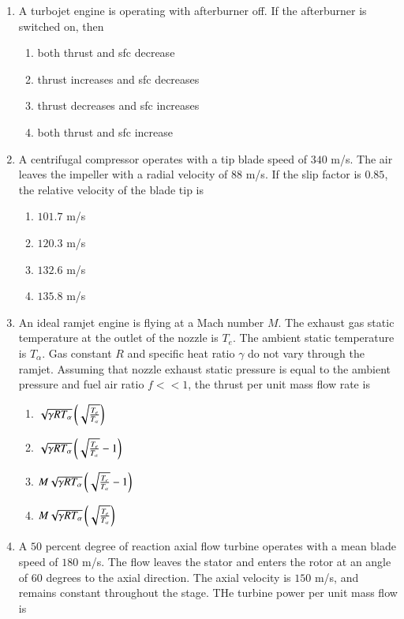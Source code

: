 \documentclass[journal,onecolumn]{IEEEtran}
\theoremstyle{remark}
\begin{document}
\begin{enumerate}
    \item A turbojet engine is operating with afterburner off. If the afterburner is switched on, then

	\begin{enumerate}
		\item both thrust and sfc decrease
		\item thrust increases and sfc decreases
		\item thrust decreases and sfc increases
		\item both thrust and sfc increase 
	\end{enumerate}

    \item A centrifugal compressor operates with a tip blade speed of $340$ m/s. The air leaves the impeller with a radial velocity of $88$ m/s. If the slip factor is $0.85$, the relative velocity of the blade tip is

	\begin{enumerate}
		\item $101.7$ m/s
		\item $120.3$ m/s
		\item $132.6$ m/s
		\item $135.8$ m/s
	\end{enumerate}

    \item An ideal ramjet engine is flying at a Mach number $M$. The exhaust gas static temperature at the outlet of the nozzle is $T_e$. The ambient static temperature is $T_{\alpha}$. Gas constant $R$ and specific heat ratio $\gamma$ do not vary through the ramjet. Assuming that nozzle exhaust static pressure is equal to the ambient pressure and fuel air ratio $f << 1$, the thrust per unit mass flow rate is

	\begin{enumerate}
		\item $\sqrt{\gamma R T_{\alpha}}\left(\sqrt{\frac{T_e}{T_{\alpha}}}\right)$
		\item $\sqrt{\gamma R T_{\alpha}}\left(\sqrt{\frac{T_e}{T_{\alpha}}} - 1\right)$
		\item $M\sqrt{\gamma R T_{\alpha}}\left(\sqrt{\frac{T_e}{T_{\alpha}}} - 1\right)$
		\item $M\sqrt{\gamma R T_{\alpha}}\left(\sqrt{\frac{T_e}{T_{\alpha}}}\right)$
	\end{enumerate}


    \item A $50$ percent degree of reaction axial flow turbine operates with a mean blade speed of $180$ m/s. The flow leaves the stator and enters the rotor at an angle of $60$ degrees to the axial direction. The axial velocity is $150$ m/s, and remains constant throughout the stage. THe turbine power per unit mass flow is


\end{enumerate}
\end{document}
